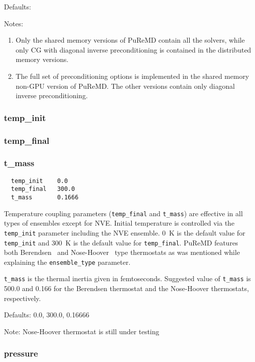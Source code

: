 \documentclass{article}
\begin{document}
Defaults: 

Notes:
\begin{enumerate}
  \item Only the shared memory versions of PuReMD contain all the solvers,
    while only CG with diagonal inverse preconditioning is contained in the
    distributed memory versions.
  \item The full set of preconditioning options is implemented in the shared
    memory non-GPU version of PuReMD. The other versions contain only diagonal
    inverse preconditioning.
\end{enumerate}

\subsubsection{temp\_init}
\label{sec:temp_init}
\subsubsection{temp\_final}
\label{sec:temp_final}
\subsubsection{t\_mass}
\label{sec:t_mass}

\begin{verbatim}
  temp_init    0.0
  temp_final   300.0
  t_mass       0.1666
\end{verbatim}
Temperature coupling parameters ({\tt temp\_final} and {\tt t\_mass}) are 
effective in all types of ensembles except for NVE. Initial temperature 
is controlled via the {\tt temp\_init} parameter including the NVE ensemble.
0~K is the default value for {\tt temp\_init} and 300~K is the default value 
for {\tt temp\_final}. PuReMD features both Berendsen~\cite{ref:berendsen} 
and Nose-Hoover~\cite{ref:klein} type thermostats as was mentioned while 
explaining the {\tt ensemble\_type} parameter.

{\tt t\_mass} is the thermal inertia given in femtoseconds. Suggested
value of {\tt t\_mass} is 500.0 and 0.166 for the Berendsen 
thermostat and the Nose-Hoover thermostats, respectively.

Defaults: 0.0, 300.0, 0.16666

Note: Nose-Hoover thermostat is still under testing

\subsubsection{pressure}
\label{sec:pressure}
\end{document}
